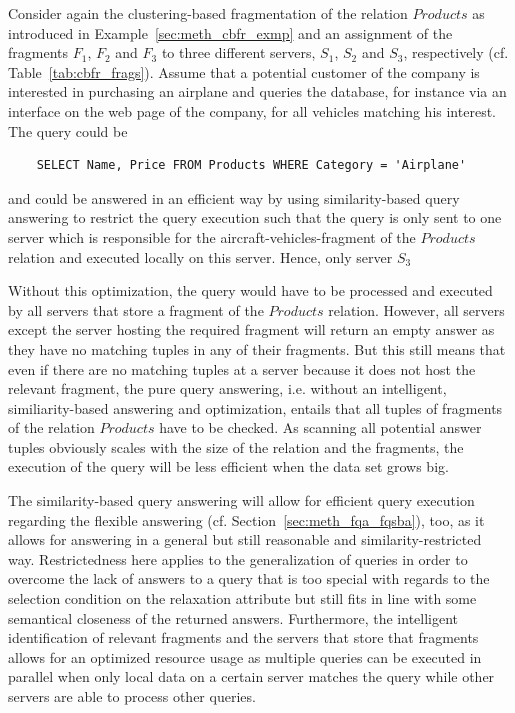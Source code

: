 \begin{exmp}
\label{sec:meth_sbqa_exmp}
Consider again the clustering-based fragmentation of the relation $Products$ as introduced in Example~\ref{sec:meth_cbfr_exmp} and an assignment of the 
fragments $F_1$, $F_2$ and $F_3$ to three different servers, $S_1$, $S_2$ and $S_3$, respectively (cf. Table~\ref{tab:cbfr_frags}). Assume that a potential
customer of the company is interested in purchasing an airplane and queries the database, for instance via an interface on the web page of the company, 
for all vehicles matching his interest. The query could be
\begin{verbatim}
    SELECT Name, Price FROM Products WHERE Category = 'Airplane'
\end{verbatim}
and could be answered in an efficient way by using similarity-based query answering to restrict the query execution such that the query is only sent to 
one server which is responsible for the aircraft-vehicles-fragment of the $Products$ relation and executed locally on this server. Hence, only server 
$S_3$

Without this optimization, the query would have to be processed and executed by all servers that store a fragment of the $Products$ relation. However, 
all servers except the server hosting the required fragment will return an empty answer as they have no matching tuples in any of their fragments. But 
this still means that even if there are no matching tuples at a server because it does not host the relevant fragment, the pure query answering, i.e.
without an intelligent, similiarity-based answering and optimization, entails that all tuples of fragments of the relation $Products$ have to be checked.
As scanning all potential answer tuples obviously scales with the size of the relation and the fragments, the execution of the query will be less 
efficient when the data set grows big.
\end{exmp}

The similarity-based query answering will allow for efficient query execution regarding the flexible answering (cf. Section~\ref{sec:meth_fqa_fqsba}), too,
as it allows for answering in a general but still reasonable and similarity-restricted way. Restrictedness here applies to the generalization of queries in
order to overcome the lack of answers to a query that is too special with regards to the selection condition on the relaxation attribute but still fits in
line with some semantical closeness of the returned answers. Furthermore, the intelligent identification of relevant fragments and the servers that store 
that fragments allows for an optimized resource usage as multiple queries can be executed in parallel when only local data on a certain server matches the
query while other servers are able to process other queries.


